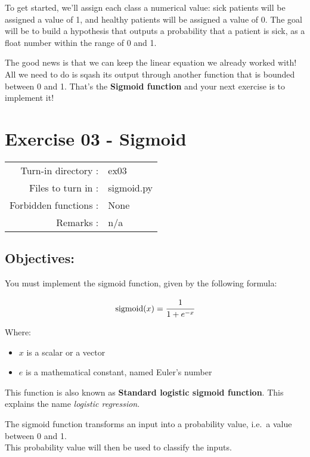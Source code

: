 \documentclass[]{article}
\begin{document}
To get started, we'll assign each class a numerical value: sick patients
will be assigned a value of 1, and healthy patients will be assigned a
value of 0. The goal will be to build a hypothesis that outputs a
probability that a patient is sick, as a float number within the range
of 0 and 1.

The good news is that we can keep the linear equation we already worked
with! All we need to do is sqash its output through another function
that is bounded between 0 and 1. That's the \textbf{Sigmoid function}
and your next exercise is to implement it! \clearpage

\hypertarget{exercise-03---sigmoid-1}{%
\section{Exercise 03 - Sigmoid}\label{exercise-03---sigmoid-1}}

\begin{longtable}[]{@{}rl@{}}
\toprule
\endhead
Turn-in directory : & ex03\tabularnewline
Files to turn in : & sigmoid.py\tabularnewline
Forbidden functions : & None\tabularnewline
Remarks : & n/a\tabularnewline
\bottomrule
\end{longtable}

\hypertarget{objectives-2}{%
\subsection{Objectives:}\label{objectives-2}}

You must implement the sigmoid function, given by the following formula:

\large

\[
\text{sigmoid}(x) = \cfrac{1} {1 + e^{-x}}
\] \normalsize

Where:

\begin{itemize}
\item
  \(x\) is a scalar or a vector
\item
  \(e\) is a mathematical constant, named Euler's number
\end{itemize}

This function is also known as \textbf{Standard logistic sigmoid
function}. This explains the name \emph{logistic regression}.

The sigmoid function transforms an input into a probability value,
i.e.~a value between 0 and 1.\\
This probability value will then be used to classify the inputs.
\end{document}
